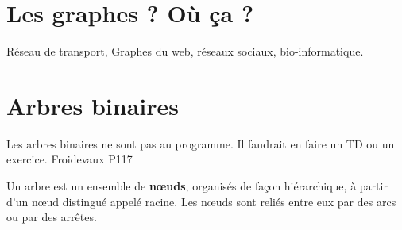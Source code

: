 \section{Les graphes ? Où ça ?}
Réseau de transport, Graphes du web, 
réseaux sociaux, bio-informatique. 

\section{Arbres binaires}

\begin{rem}
Les arbres binaires ne sont pas au programme. Il faudrait en faire un TD ou un exercice.  Froidevaux P117
\end{rem}
\begin{defi}[Arbres]\cite{ref_01}
Un arbre est un ensemble de \textbf{n\oe{}uds}, organisés de façon hiérarchique, à partir d'un n\oe{}ud distingué appelé racine. Les n\oe{}uds sont reliés entre eux par des arcs ou par des arrêtes. 
\end{defi}


\setlength{\columnseprule}{0pt}

